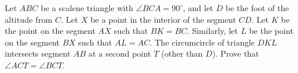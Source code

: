 Let $ABC$ be a scalene triangle with $\angle BCA = 90^{\circ}$, and let $D$ be the foot of the altitude from $C$.  Let $X$ be a point in the interior of the segment $CD$.  Let $K$ be the point on the segment $AX$ such that $BK = BC$.  Similarly, let $L$ be the point on the segment $BX$ such that $AL = AC$.  The circumcircle of triangle $DKL$ intersects segment $AB$ at a second point $T$ (other than $D$).  Prove that $\angle ACT = \angle BCT$.